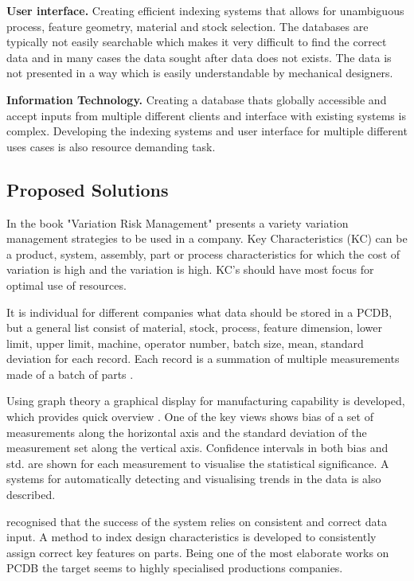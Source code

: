 \documentclass[aip,amsmath,reprint, author-year]{revtex4-1}
\begin{document}
\textbf{User interface.} Creating efficient indexing systems that allows for unambiguous process, feature geometry, material and stock selection. The databases are typically not easily searchable which makes it very difficult to find the correct data and in many cases the data sought after data does not exists. 
The data is not presented in a way which is easily understandable by mechanical designers.

\textbf{Information Technology.} Creating a database thats globally accessible and accept inputs from multiple different clients and interface with existing systems is complex. 
Developing the indexing systems and user interface for multiple different uses cases is also resource demanding task.  

\subsection{Proposed Solutions}
In the book "Variation Risk Management" \cite{thornton2004variation} presents a variety variation management strategies to be used in a company. 
Key Characteristics (KC) can be a product, system, assembly, part or process characteristics for which the cost of variation is high and the variation is high. 
KC's should have most focus for optimal use of resources. 

It is individual for different companies what data should be stored in a PCDB, but a general list consist of material, stock, process, feature dimension, lower limit, upper limit, machine, operator number, batch size, mean, standard deviation for each record. Each record is a summation of multiple measurements made of a batch of parts \citep{thornton2004variation}.

Using graph theory a graphical display for manufacturing capability is developed, which provides quick overview \citep{thornton2000use}. 
One of the key views shows bias of a set of measurements along the horizontal axis and the standard deviation of the measurement set along the vertical axis. 
Confidence intervals in both bias and std. are shown for each measurement to visualise the statistical significance. 
A systems for automatically detecting and visualising trends in the data is also described.

\cite{kern2003forecasting} recognised that the success of the system relies on consistent and correct data input. 
A method to index design characteristics is developed to consistently assign correct key features on parts. Being one of the most elaborate works on PCDB the target seems to highly specialised productions companies. 
\end{document}
